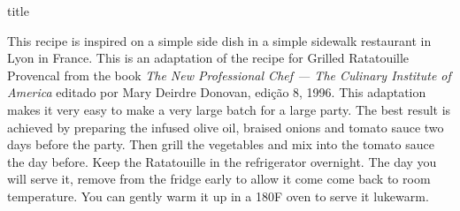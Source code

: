 \documentclass [11pt, letterpaper] {article}
\begin{document}
 {title}

This recipe is inspired on a simple side dish in a simple sidewalk restaurant in Lyon in France. This is an adaptation of the recipe for Grilled Ratatouille Provencal from the book {\em The New Professional Chef --- The Culinary Institute of America} editado por Mary Deirdre Donovan, edi\c{c}\~ao 8, 1996. This adaptation makes it very easy to make a very large batch for a large party. The best result is achieved by preparing the infused olive oil, braised onions and tomato sauce two days before the party. Then grill the vegetables and mix into the tomato sauce the day before. Keep the Ratatouille in the refrigerator overnight. The day you will serve it, remove from the fridge early to allow it come come back to room temperature. You can gently warm it up in a 180F oven to serve it lukewarm.
\vspace{0.5in}
\end{document}
